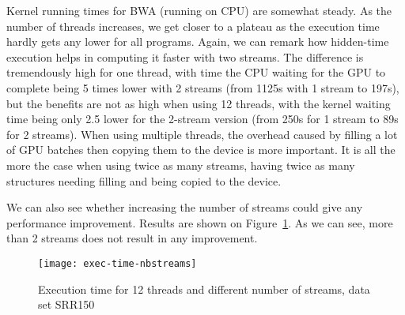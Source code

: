 Kernel running times for BWA (running on CPU) are somewhat steady. As the number of threads increases, we get closer to a plateau as the execution time hardly gets any lower for all programs. Again, we can remark how hidden-time execution helps in computing it faster with two streams. The difference is tremendously high for one thread, with time the CPU waiting for the GPU to complete being 5 times lower with 2 streams (from 1125s with 1 stream to 197s), but the benefits are not as high when using 12 threads, with the kernel waiting time being only 2.5 lower for the 2-stream version (from 250s for 1 stream to 89s for 2 streams). When using multiple threads, the overhead caused by filling a lot of GPU batches then copying them to the device is more important. It is all the more the case when using twice as many streams, having twice as many structures needing filling and being copied to the device.

We can also see whether increasing the number of streams could give any performance improvement. Results are shown on Figure~\ref{fig:exec-time-nbstreams}. As we can see, more than 2 streams does not result in any improvement. 

\begin{figure}[h]
	\centering
	\texttt{[image: exec-time-nbstreams]}
	\caption{Execution time for 12 threads and different number of streams, data set SRR150}
	\label{fig:exec-time-nbstreams}
\end{figure}

